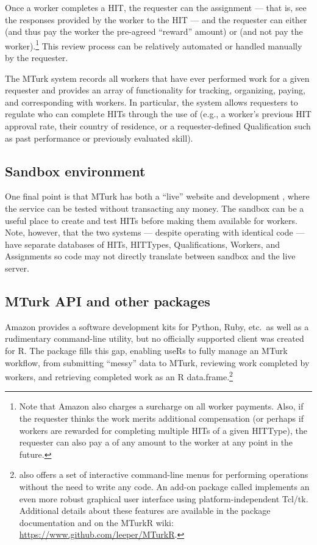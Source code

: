 Once a worker completes a HIT, the requester can  the assignment --- that is, see the responses provided by the worker to the HIT --- and the requester can either  (and thus pay the worker the pre-agreed ``reward'' amount) or  (and not pay the worker).\footnote{Note that Amazon also charges a surcharge on all worker payments. Also, if the requester thinks the work merits additional compensation (or perhaps if workers are rewarded for completing multiple HITs of a given HITType), the requester can also pay a  of any amount to the worker at any point in the future.} This review process can be relatively automated or handled manually by the requester.

The MTurk system records all workers that have ever performed work for a given requester and provides an array of functionality for tracking, organizing, paying, and corresponding with workers. In particular, the system allows requesters to regulate who can complete HITs through the use of  (e.g., a worker's previous HIT approval rate, their country of residence, or a requester-defined Qualification such as past performance or previously evaluated skill).

\subsection{Sandbox environment}
One final point is that MTurk has both a ``live'' website and development , where the service can be tested without transacting any money. The sandbox can be a useful place to create and test HITs before making them available for workers. Note, however, that the two systems --- despite operating with identical code --- have separate databases of HITs, HITTypes, Qualifications, Workers, and Assignments so code may not directly translate between sandbox and the live server.

\subsection{MTurk API and other packages}
Amazon provides a software development kits for Python, Ruby, etc.\ as well as a rudimentary command-line utility, but no officially supported client was created for R. The  package fills this gap, enabling useRs to fully manage an MTurk workflow, from submitting ``messy'' data to MTurk, reviewing work completed by workers, and retrieving completed work as an R data.frame.\footnote{ also offers a set of interactive command-line menus for performing  operations without the need to write any code. An add-on package called  implements an even more robust graphical user interface using platform-independent Tcl/tk. Additional details about these  features are available in the package documentation and on the MTurkR wiki: \url{https://www.github.com/leeper/MTurkR}.}

